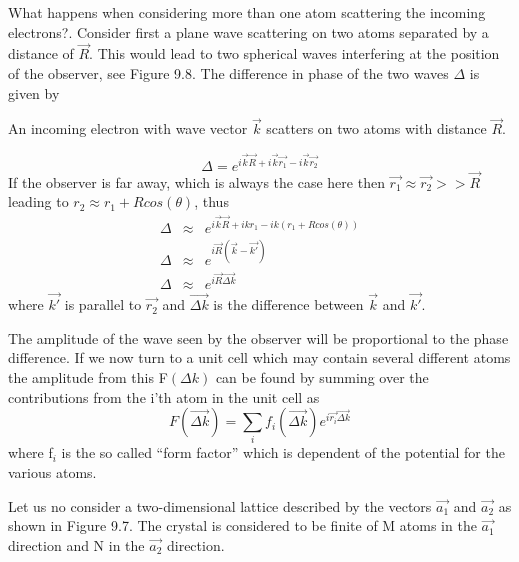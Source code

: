 What happens when considering more than one  atom scattering the incoming electrons?. Consider  first  a plane wave scattering on two atoms separated by a distance of $\overrightarrow{R}$. This would lead to two spherical waves interfering at the position of the observer, see Figure 9.8. The difference in phase of the two waves $\Delta$ is given by

\vspace*{11cm}

 An incoming electron with wave vector $\overrightarrow{k}$ scatters on two atoms with distance $\overrightarrow{R}$.
 
\vspace{1cm}

\begin{equation}
\Delta=e^{i\overrightarrow{k} \overrightarrow{R}+i\overrightarrow{k} \overrightarrow{r_1}-i\overrightarrow{k} \overrightarrow{r_2}} 
\end{equation}
If the observer is far away, which is always the case here then $\overrightarrow{r_1} \approx  \overrightarrow{r_2} >> \overrightarrow{R}$ leading to $r_2 \approx r_1 + Rcos(\theta)$, thus
\begin{eqnarray}
\Delta &\approx& e^{i\overrightarrow{k} \overrightarrow{R}+ikr_1-ik(r_1+Rcos(\theta))}\\ 
\Delta &\approx& e^{i \overrightarrow{R}( \overrightarrow{k}- \overrightarrow{k'})}\\
\Delta &\approx& e^{i \overrightarrow{R} \overrightarrow{\Delta k}}
\end{eqnarray}
where $\overrightarrow{k'}$ is parallel to $\overrightarrow{r_2}$ and  $\overrightarrow{\Delta k}$ is the difference between $\overrightarrow{k}$ and $\overrightarrow{k'}$.

The amplitude of the wave seen by the observer will be  proportional to the phase difference. If we now turn to a unit cell which may contain several different atoms the amplitude from this  F$(\Delta k)$ can be found by summing over the contributions from the i'th atom in the unit cell as
\begin{equation}
F(\overrightarrow{\Delta k})= \sum_{i} f_{i}(\overrightarrow{\Delta k}) e^{i \overrightarrow{r_i} \overrightarrow{\Delta k}}
\end{equation}
where f$_{i}$ is the so called ``form factor'' which is dependent of the potential for the various atoms.

Let us no consider a two-dimensional lattice described by the vectors $\overrightarrow{a_1}$ and $\overrightarrow{a_2}$ as shown in Figure 9.7. The crystal is considered to be finite of M atoms in the $\overrightarrow{a_1}$  direction and N in the $\overrightarrow{a_2}$ direction.


